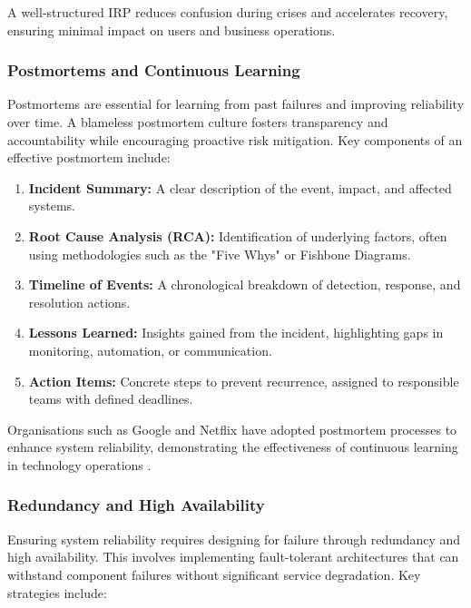 A well-structured IRP reduces confusion during crises and accelerates recovery, ensuring minimal impact on users and business operations.

\subsubsection{Postmortems and Continuous Learning}

Postmortems are essential for learning from past failures and improving reliability over time. A blameless postmortem culture fosters transparency and accountability while encouraging proactive risk mitigation. Key components of an effective postmortem include:

\begin{enumerate}
    \item \textbf{Incident Summary:} A clear description of the event, impact, and affected systems.
    \item \textbf{Root Cause Analysis (RCA):} Identification of underlying factors, often using methodologies such as the "Five Whys" or Fishbone Diagrams.
    \item \textbf{Timeline of Events:} A chronological breakdown of detection, response, and resolution actions.
    \item \textbf{Lessons Learned:} Insights gained from the incident, highlighting gaps in monitoring, automation, or communication.
    \item \textbf{Action Items:} Concrete steps to prevent recurrence, assigned to responsible teams with defined deadlines.
\end{enumerate}

Organisations such as Google and Netflix have adopted postmortem processes to enhance system reliability, demonstrating the effectiveness of continuous learning in technology operations \cite{allspaw2012postmortem}.

\subsubsection{Redundancy and High Availability}

Ensuring system reliability requires designing for failure through redundancy and high availability. This involves implementing fault-tolerant architectures that can withstand component failures without significant service degradation. Key strategies include:

